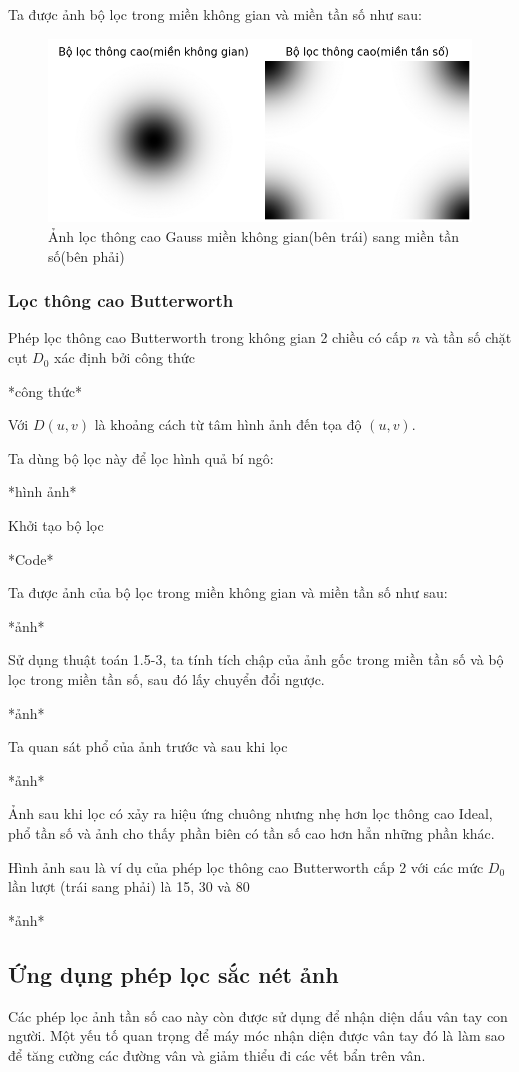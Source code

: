 \documentclass[12pt,a4paper]{report}
\numberwithin{equation}{section}
\theoremstyle{definition} %
\begin{document}
Ta được ảnh bộ lọc trong miền không gian và miền tần số như sau: 
\begin{figure}[H]
\centering
\includegraphics[width=0.8\linewidth]{img/GaussHP-KG-TS.png}
\caption{Ảnh lọc thông cao Gauss miền không gian(bên trái) sang miền tần số(bên phải)}
\end{figure}
\subsubsection{Lọc thông cao Butterworth}



Phép lọc thông cao Butterworth trong không gian 2 chiều có cấp $n$ và tần số chặt cụt $D_0$ xác định bởi công thức

*công thức*

Với $D(u,v)$ là khoảng cách từ tâm hình ảnh đến tọa độ $(u,v)$.

Ta dùng bộ lọc này để lọc hình quả bí ngô:

*hình ảnh*

Khởi tạo bộ lọc

*Code*

Ta được ảnh của bộ lọc trong miền không gian và miền tần số như sau:

*ảnh*

Sử dụng thuật toán 1.5-3, ta tính tích chập của ảnh gốc trong miền tần số và bộ lọc trong miền tần số, sau đó lấy chuyển đổi ngược. 

*ảnh*

Ta quan sát phổ của ảnh trước và sau khi lọc

*ảnh*

Ảnh sau khi lọc có xảy ra hiệu ứng chuông nhưng nhẹ hơn lọc thông cao Ideal, phổ tần số và ảnh cho thấy phần biên có tần số cao hơn hẳn những phần khác.

Hình ảnh sau là ví dụ của phép lọc thông cao Butterworth cấp 2 với các mức $D_0$ lần lượt (trái sang phải) là 15, 30 và 80

*ảnh*
\subsection{Ứng dụng phép lọc sắc nét ảnh}
Các phép lọc ảnh tần số cao này còn được sử dụng để nhận diện dấu vân tay con người. Một yếu tố quan trọng để máy móc nhận diện được vân tay đó là làm sao để tăng cường các đường vân và giảm thiểu đi các vết bẩn trên vân. 
\end{document}
